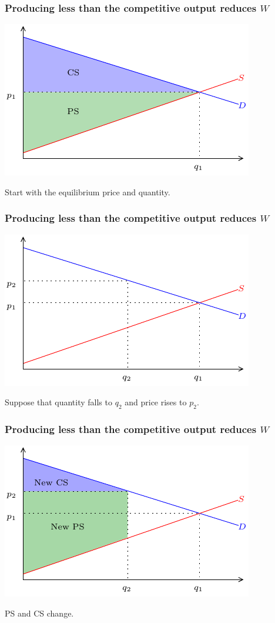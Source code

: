 \documentclass[xcolor=pdftex,dvipsnames]{beamer}
\begin{document}
\begin{frame}
\frametitle{Producing less than the  competitive output reduces $W$}
\begin{center}
\includegraphics{pics/CEEff1}
\end{center}
Start with the equilibrium price and quantity.
\end{frame}
\begin{frame}
\frametitle{Producing less than the  competitive output reduces $W$}
\begin{center}
\includegraphics{pics/CEEff2}
\end{center}
Suppose that quantity falls to $q_2$ and price rises to $p_2$.
\end{frame}
\begin{frame}
\frametitle{Producing less than the  competitive output reduces $W$}
\begin{center}
\includegraphics{pics/CEEff3}
\end{center}
PS and CS change.\end{frame}
\end{document}
